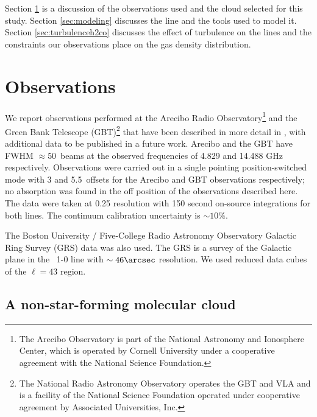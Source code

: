 
Section \ref{sec:observations} is a discussion of the observations used and the
cloud selected  for this study.  Section  \ref{sec:modeling} discusses the
\formaldehyde line and the tools used to model it.  Section
\ref{sec:turbulenceh2co} discusses the effect of turbulence on the \formaldehyde
lines and the constraints our observations place on the gas density
distribution.


\section{Observations}
\label{sec:observations}
We report \formaldehyde observations performed at the Arecibo Radio
Observatory\footnote{The Arecibo Observatory is part of the National Astronomy
and Ionosphere Center, which is operated by Cornell University under a
cooperative agreement with the National Science Foundation.  } and the Green
Bank Telescope (GBT)\footnote{ The National Radio Astronomy Observatory operates the
GBT and VLA and is a facility of the National Science Foundation operated under
cooperative agreement by Associated Universities, Inc.  } that have been 
described in more detail in \citet{Ginsburg2011a}, with additional data to be
published in a future work.  Arecibo and
the GBT have FWHM $\approx50$\arcsec\ beams at the observed frequencies of
4.829 and 14.488 GHz respectively.  Observations were carried out in a single
pointing position-switched mode with 3 and 5.5\arcmin\ offsets for the Arecibo
and GBT observations respectively; no absorption was found in the off position
of the observations described here.  The data were taken at 0.25 \kms
resolution with 150 second on-source integrations for both lines.  The continuum
calibration uncertainty is $\sim 10\%$.

The Boston University / Five-College Radio Astronomy Observatory Galactic Ring
Survey (GRS) \thirteenco data was also used.  The GRS \citep{Jackson2006a}
is a survey of the Galactic plane in the \thirteenco\ 1-0 line with $\sim
46\arcsec$ resolution.  We used reduced data cubes of the $\ell=43$ region.

\subsection{\GRSMC A non-star-forming molecular cloud}

